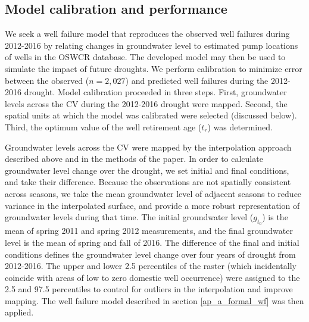 \subsection{Model calibration and performance}
\label{ap_a_calib}

We seek a well failure model that reproduces the observed well failures during 2012-2016 by relating changes in groundwater level to estimated pump locations of wells in the OSWCR database. The developed model may then be used to simulate the impact of future droughts. We perform calibration to minimize error between the observed ($n \! = \! 2,027$) and predicted well failures during the 2012-2016 drought. Model calibration proceeded in three steps. First, groundwater levels across the CV during the 2012-2016 drought were mapped. Second, the spatial units at which the model was calibrated were selected (discussed below). Third, the optimum value of the well retirement age ($t_r$) was determined.

Groundwater levels across the CV were mapped by the interpolation approach described above and in the methods of the paper. In order to calculate groundwater level change over the drought, we set initial and final conditions, and take their difference. Because the observations are not spatially consistent across seasons, we take the mean groundwater level of adjacent seasons to reduce variance in the interpolated surface, and provide a more robust representation of groundwater levels during that time. The initial groundwater level ($g_{t_0}$) is the mean of spring 2011 and spring 2012 measurements, and the final groundwater level is the mean of spring and fall of 2016. The difference of the final and initial conditions defines the groundwater level change over four years of drought from 2012-2016. The upper and lower 2.5 percentiles of the raster (which incidentally coincide with areas of low to zero domestic well occurrence) were assigned to the 2.5 and 97.5 percentiles to control for outliers in the interpolation and improve mapping. The well failure model described in section \ref{ap_a_formal_wf} was then applied.  

